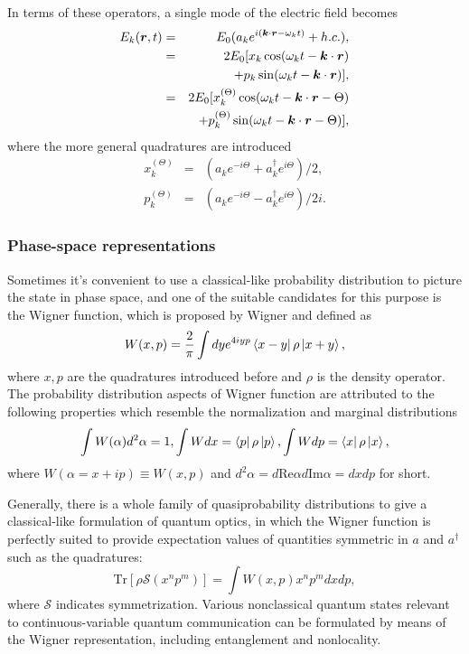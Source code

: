 \documentclass[%
 reprint,
groupedaddress,
showpacs,
 amsmath,amssymb,
 aps,
prb,
]{revtex4-1}
\begin{document}
		In terms of these operators, a single mode of the electric field becomes
		\begin{eqnarray}
			 E_k(\bm r,t) &=& E_0 ( a_k e^{i(\bm k \cdot \bm r - \omega_k t)} +h.c.),\\
			&= &2E_0 [ x_k \cos ( \omega_k t - \bm k \cdot \bm r  ) \notag\\
			&&+ p_k \sin ( \omega_k t - \bm k \cdot \bm r  ) ],\\
			& =& 2E_0 [ x_k^{(\Theta)} \cos ( \omega_k t - \bm k \cdot \bm r -\Theta ) \notag\\
			&&+ p_k^{(\Theta)} \sin ( \omega_k t - \bm k \cdot \bm r -\Theta ) ],
		\end{eqnarray}
		where the more general quadratures are introduced
		\begin{eqnarray}
			x_k^{(\Theta)} &=& ( a_k e^{-i \Theta } + a_k^\dagger e^{ i \Theta} )/2,\\
			p_k^{(\Theta)} &=& ( a_k e^{-i \Theta } - a_k^\dagger e^{ i\Theta} )/2i.
		\end{eqnarray}

		\subsubsection{Phase-space representations} %
		\label{ssub:phase_space_representations}
			Sometimes it's convenient to use a classical-like probability distribution to picture the state in phase space, and one of the suitable candidates for this purpose is the Wigner function, which is proposed by Wigner\cite{PhysRev.40.749} and defined as
			\begin{equation}
			W(x,p) = \frac{2}{\pi} \int dy e^{4iyp}\bra{x-y} \rho \ket{x+y},
			\end{equation}
			where $x,p$ are the quadratures introduced before and $ \rho $ is the density operator. The probability distribution aspects of Wigner function are attributed to the following properties which resemble the normalization and marginal distributions
			\begin{eqnarray}
				\int W(\alpha)d^2 \alpha = 1, \int W dx = \bra p \rho \ket p, \int W dp = \bra x \rho \ket x, \notag
			\end{eqnarray}
			where $W (\alpha = x+ip) \equiv W(x,p) $ and $d^2 \alpha = d \mathrm{Re} \alpha d \mathrm{Im} \alpha = dxdp $ for short.

			Generally, there is a whole family of quasiprobability distributions to give a classical-like formulation of quantum optics, in which the Wigner function is perfectly suited to provide expectation values of quantities symmetric in $a$ and $a^\dagger $ such as the quadratures:
			\begin{equation}
			\label{eqn:quad_aver}
			\mathrm{Tr}[\rho \mathcal S(x^np^m)] = \int W(x,p)x^np^mdxdp,
			\end{equation}
			where $\mathcal S$ indicates symmetrization. Various nonclassical quantum states relevant to continuous-variable quantum communication can be formulated by means of the Wigner representation, including entanglement and nonlocality.			
\end{document}
